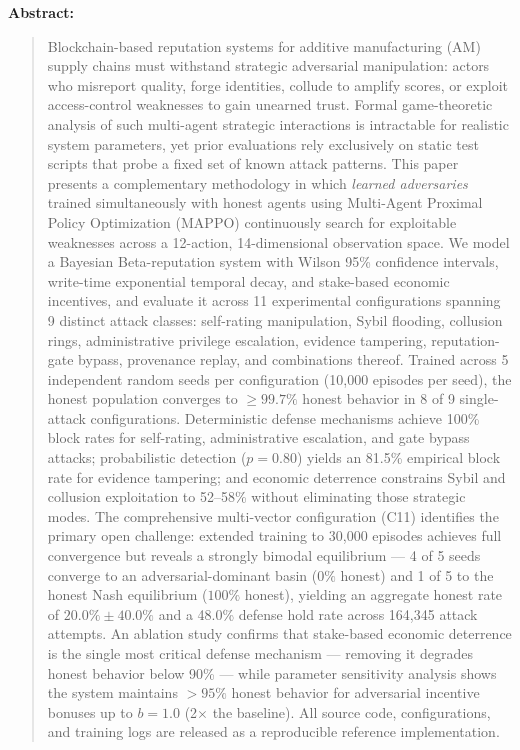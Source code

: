 
\begin{center}
\textbf{Abstract:}
\end{center}
\begin{quote}
\small
Blockchain-based reputation systems for additive manufacturing (AM) supply
chains must withstand strategic adversarial manipulation: actors who
misreport quality, forge identities, collude to amplify scores, or exploit
access-control weaknesses to gain unearned trust.  Formal game-theoretic
analysis of such multi-agent strategic interactions is intractable for
realistic system parameters, yet prior evaluations rely exclusively on
static test scripts that probe a fixed set of known attack patterns.  This
paper presents a complementary methodology in which \emph{learned
adversaries} trained simultaneously with honest agents using Multi-Agent
Proximal Policy Optimization (MAPPO) continuously search for exploitable
weaknesses across a 12-action, 14-dimensional observation space.  We model
a Bayesian Beta-reputation system with Wilson 95\% confidence intervals,
write-time exponential temporal decay, and stake-based economic incentives,
and evaluate it across 11 experimental configurations spanning 9 distinct
attack classes: self-rating manipulation, Sybil flooding, collusion rings,
administrative privilege escalation, evidence tampering, reputation-gate
bypass, provenance replay, and combinations thereof.  Trained across 5
independent random seeds per configuration (10{,}000 episodes per seed),
the honest population converges to $\geq\!99.7\%$ honest behavior in 8 of 9
single-attack configurations.  Deterministic defense mechanisms achieve
100\% block rates for self-rating, administrative escalation, and gate bypass
attacks; probabilistic detection ($p=0.80$) yields an 81.5\% empirical block
rate for evidence tampering; and economic deterrence constrains Sybil and
collusion exploitation to 52--58\% without eliminating those strategic modes.
The comprehensive multi-vector configuration (C11) identifies the primary
open challenge: extended training to 30{,}000 episodes achieves full
convergence but reveals a strongly bimodal equilibrium --- 4 of 5 seeds
converge to an adversarial-dominant basin ($0\%$ honest) and 1 of 5 to the
honest Nash equilibrium ($100\%$ honest), yielding an aggregate honest rate
of $20.0\% \pm 40.0\%$ and a 48.0\% defense hold rate across 164{,}345
attack attempts.  An ablation study confirms that stake-based economic deterrence is the single most critical defense mechanism --- removing it degrades honest behavior below 90\% --- while parameter sensitivity analysis shows the system maintains $>95\%$ honest behavior for adversarial incentive bonuses up to $b=1.0$ (2$\times$ the baseline).  All source code, configurations, and training
logs are released as a reproducible reference implementation.
\end{quote}

